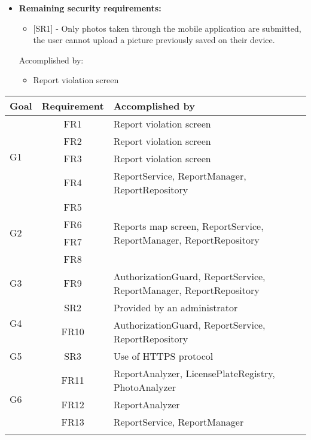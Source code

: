 \begin{itemize}[label={}]
    \item \textbf{Remaining security requirements:}
        \begin{itemize}[label={}]
            \item {[SR1]} - Only photos taken through the mobile application are submitted, the user cannot upload a picture previously saved on their device.
        \end{itemize}
        Accomplished by:
        \begin{itemize}[label={\textbullet}]
            \item Report violation screen
        \end{itemize}
\end{itemize}

\begin{table}[H]
    \centering
    \begin{tabular}{|p{2cm}|c|p{8cm}|}
        \hline
        \textbf{Goal} & \textbf{Requirement} & \textbf{Accomplished by} \\ \hline
        \multirow{4}{2cm}{G1} & FR1 & Report violation screen \\ \cline{2-3}
        & FR2 & Report violation screen \\ \cline{2-3}
        & FR3 & Report violation screen \\ \cline{2-3}
        & FR4 & ReportService, ReportManager, ReportRepository \\ \hline
        \multirow{4}{2cm}{G2} & FR5 & \multirow{4}{8cm}{Reports map screen, ReportService, ReportManager, ReportRepository} \\ \cline{2-2}
        & FR6 & \\ \cline{2-2}
        & FR7 & \\ \cline{2-2}
        & FR8 & \\ \hline
        G3 & FR9 & AuthorizationGuard, ReportService, ReportManager, ReportRepository \\ \hline
        \multirow{2}{2cm}{G4} & SR2 & Provided by an administrator \\ \cline{2-3}
        & FR10 & AuthorizationGuard, ReportService, ReportRepository \\ \hline
        G5 & SR3 & Use of HTTPS protocol \\ \hline
        \multirow{5}{2cm}{G6} & FR11 & ReportAnalyzer, LicensePlateRegistry, PhotoAnalyzer \\ \cline{2-3}
        & FR12 & ReportAnalyzer \\ \cline{2-3}
        & FR13 & ReportService, ReportManager \\ \cline{2-3}

\end{tabular}
\end{table}
